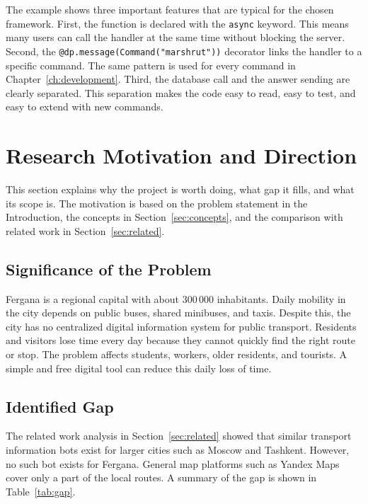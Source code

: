 The example shows three important features that are typical for the
chosen framework. First, the function is declared with the
\texttt{async} keyword. This means many users can call the handler at
the same time without blocking the server. Second, the
\texttt{@dp.message(Command("marshrut"))} decorator links the handler
to a specific command. The same pattern is used for every command in
Chapter~\ref{ch:development}. Third, the database call and the answer
sending are clearly separated. This separation makes the code easy to
read, easy to test, and easy to extend with new commands.

\section{Research Motivation and Direction}
\label{sec:motivation}

This section explains why the project is worth doing, what gap it fills,
and what its scope is. The motivation is based on the problem statement
in the Introduction, the concepts in Section~\ref{sec:concepts}, and
the comparison with related work in Section~\ref{sec:related}.

\subsection{Significance of the Problem}
\label{subsec:significance}

Fergana is a regional capital with about 300\,000 inhabitants. Daily
mobility in the city depends on public buses, shared minibuses, and
taxis. Despite this, the city has no centralized digital information
system for public transport. Residents and visitors lose time every day
because they cannot quickly find the right route or stop. The problem
affects students, workers, older residents, and tourists. A simple and
free digital tool can reduce this daily loss of time.\cite{stat_uz_fergana}

\subsection{Identified Gap}
\label{subsec:gap}

The related work analysis in Section~\ref{sec:related} showed that
similar transport information bots exist for larger cities such as
Moscow and Tashkent. However, no such bot exists for Fergana. General
map platforms such as Yandex Maps cover only a part of the local routes.
A summary of the gap is shown in Table~\ref{tab:gap}.

